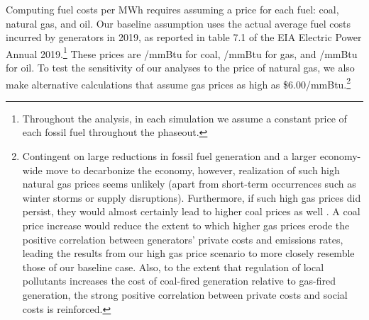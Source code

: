\documentclass[12pt]{article}
\begin{document}
Computing fuel costs per MWh requires assuming a price for each fuel: coal, natural gas, and oil. Our baseline assumption uses the actual average fuel costs incurred by generators in 2019, as reported in table 7.1 of the EIA Electric Power Annual 2019.\footnote{Throughout the analysis, in each simulation we assume a constant price of each fossil fuel throughout the phaseout.} These prices are \unskip/mmBtu for coal, \unskip/mmBtu for gas, and \unskip/mmBtu for oil. To test the sensitivity of our analyses to the price of natural gas, we also make alternative calculations that assume gas prices as high as \$6.00/mmBtu.\footnote{Contingent on large reductions in fossil fuel generation and a larger economy-wide move to decarbonize the economy, however, realization of such high natural gas prices seems unlikely (apart from short-term occurrences such as winter storms or supply disruptions). Furthermore, if such high gas prices did persist, they would almost certainly lead to higher coal prices as well \citep{preonas2022marketpower}. A coal price increase would reduce the extent to which higher gas prices erode the positive correlation between generators' private costs and emissions rates, leading the results from our high gas price scenario to more closely resemble those of our baseline case. Also, to the extent that regulation of local pollutants increases the cost of coal-fired generation relative to gas-fired generation, the strong positive correlation between private costs and social costs is reinforced.}
\end{document}
